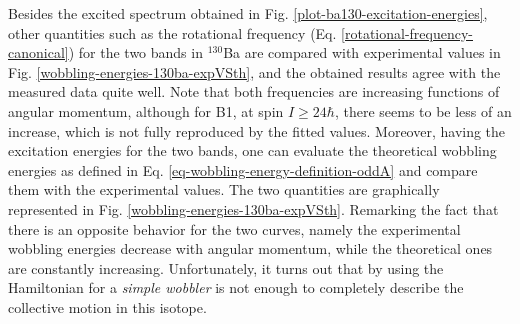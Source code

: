 Besides the excited spectrum obtained in Fig. \ref{plot-ba130-excitation-energies}, other quantities such as the rotational frequency (Eq. \ref{rotational-frequency-canonical}) for the two bands in $^{130}$Ba are compared with experimental values in Fig. \ref{wobbling-energies-130ba-expVSth}, and the obtained results agree with the measured data quite well. Note that both frequencies are increasing functions of angular momentum, although for B1, at spin $I\geq 24\hbar$, there seems to be less of an increase, which is not fully reproduced by the fitted values. Moreover, having the excitation energies for the two bands, one can evaluate the theoretical wobbling energies as defined in Eq. \ref{eq-wobbling-energy-definition-oddA} and compare them with the experimental values. The two quantities are graphically represented in Fig. \ref{wobbling-energies-130ba-expVSth}. Remarking the fact that there is an opposite behavior for the two curves, namely the experimental wobbling energies decrease with angular momentum, while the theoretical ones are constantly increasing. Unfortunately, it turns out that by using the Hamiltonian for a \emph{simple wobbler} is not enough to completely describe the collective motion in this isotope.
